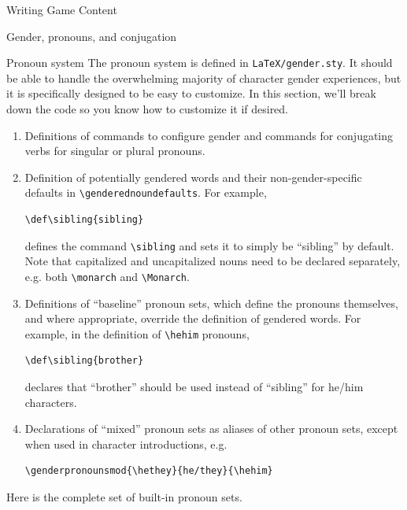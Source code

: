 \documentclass[sheet]{GameTexBase}
\newcommand{\pronounfile}{\lstinline|LaTeX/gender.sty|}
\begin{document}
\begin{section}{Writing Game Content}
\begin{subsection}{Gender, pronouns, and conjugation}
\begin{subsubsection}{Pronoun system}
The pronoun system is defined in \pronounfile{}.  It should be able to handle the overwhelming majority of character gender experiences, but it is specifically designed to be easy to customize.
In this section, we'll break down the code so you know how to customize it if desired.

\begin{enumerate}
\item Definitions of commands to configure gender and commands for conjugating verbs for singular or plural pronouns.
\item Definition of potentially gendered words and their non-gender-specific defaults in \lstinline|\genderednoundefaults|.  For example,
\begin{verbatim}
\def\sibling{sibling}
\end{verbatim}
defines the command \lstinline|\sibling| and sets it to simply be ``sibling'' by default.  Note that capitalized and uncapitalized nouns need to be declared separately, e.g. both \lstinline|\monarch| and \lstinline|\Monarch|.
\item Definitions of ``baseline'' pronoun sets, which define the pronouns themselves, and where appropriate, override the definition of gendered words.  For example, in the definition of \lstinline|\hehim| pronouns,
\begin{verbatim}
\def\sibling{brother}
\end{verbatim}
declares that ``brother'' should be used instead of ``sibling'' for he/him characters.
\item Declarations of ``mixed'' pronoun sets as aliases of other pronoun sets, except when used in character introductions, e.g.
\begin{verbatim}
\genderpronounsmod{\hethey}{he/they}{\hehim}
\end{verbatim}
\end{enumerate}

Here is the complete set of built-in pronoun sets.


\end{subsubsection}
\end{subsection}
\end{section}
\end{document}
